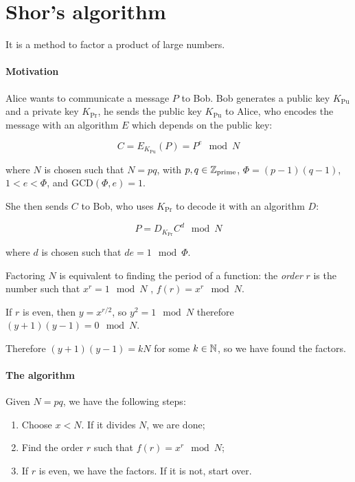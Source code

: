 \documentclass[main_montangero.tex]{subfiles}
\begin{document}
\section{Shor's algorithm}

It is a method to factor a product of large numbers.

\paragraph{Motivation}

Alice wants to communicate a message \(P\) to Bob.
Bob generates a public key \( K _{\text{Pu}} \) and a private key \( K _{\text{Pr}}  \), he sends the public key \( K _{\text{Pu}} \) to Alice, who encodes the message with an algorithm \(E\) which depends on the public key:

\begin{equation}
  C = E _{K _{\text{Pu}} } (P) = P ^e \mod N
\end{equation}

where \( N \) is chosen such that \( N = pq \), with \( p, q \in \mathbb{Z}_{\text{prime}} \), \(\Phi = (p-1) (q-1)\), \( 1<e<\Phi \),  and \( \text{GCD}(\Phi, e) = 1 \).

She then sends \( C \) to Bob, who uses \( K _{\text{Pr}} \) to decode it with an algorithm \(D\):

\begin{equation}
  P = D _{K _{\text{Pr}}} C^d \mod N %
\end{equation}

where \( d \) is chosen such that \( de = 1 \mod \Phi \).

Factoring \( N \) is equivalent to finding the period of a function: the \emph{order} \( r \) is the number such that \( x ^{r} = 1 \mod N  \) , \( f(r) = x^r \mod N \).

If \( r \) is even, then \( y = x ^{r/2}  \), so \( y^2 = 1 \mod N \) therefore \( (y+1)(y-1) = 0 \mod N \).

Therefore \( (y+1)(y-1) = kN \) for some \( k \in \mathbb{N} \), so we have found the factors.

\paragraph{The algorithm}

Given \( N = pq \), we have the following steps:

\begin{enumerate}
  \item Choose \( x<N \). If it divides \( N \), we are done;
  \item Find the order \( r \) such that \( f(r) = x^r \mod N \); \label{item:qft}
  \item If \( r \) is even, we have the factors. If it is not, start over.
\end{enumerate}
\end{document}
